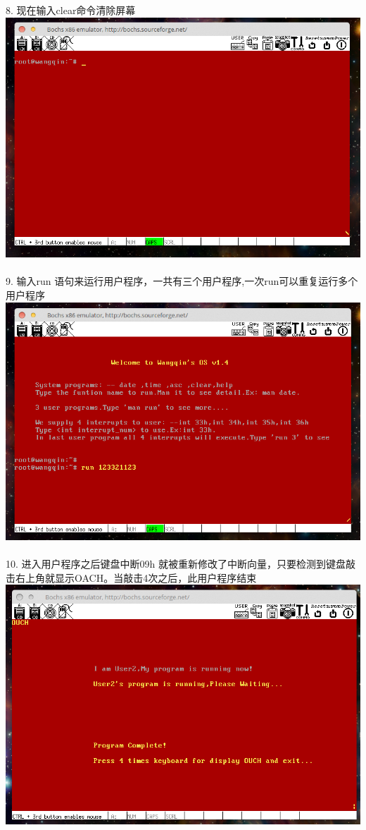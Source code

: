 \documentclass[a4paper]{article}
\begin{document}
{8. 现在输入clear命令清除屏幕
{\center\includegraphics[scale=0.5]{Illustrations/afterclear.png}}\\\\
9. 输入run 语句来运行用户程序，一共有三个用户程序,一次run可以重复运行多个用户程序
{\center\includegraphics[scale=0.5]{Illustrations/runseqs.png}}\\\\
10. 进入用户程序之后键盘中断09h 就被重新修改了中断向量，只要检测到键盘敲击右上角就显示OACH。当敲击4次之后，此用户程序结束
{\center\includegraphics[scale=0.5]{Illustrations/ouch.png}}\\\\
}
\end{document}
